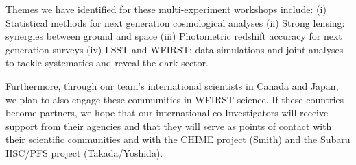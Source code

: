 Themes we have identified for these multi-experiment workshops include: (i) Statistical methods for next generation cosmological analyses (ii) Strong lensing: synergies between ground and space (iii) Photometric redshift accuracy for next generation surveys (iv) LSST and WFIRST: data simulations and joint analyses to tackle systematics and reveal the dark sector.
%


Furthermore, through our team's international scientists in Canada and Japan, we plan to also engage these communities in WFIRST science.  If these  countries become partners, we hope that our international co-Investigators will receive support from their agencies and that they will serve as points of contact with their scientific communities and with the CHIME project (Smith) and the Subaru HSC/PFS project (Takada/Yoshida).





